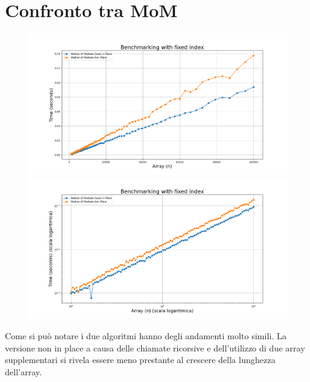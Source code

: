 \documentclass[a4paper]{article}
\begin{document}
\section{Confronto tra MoM}
\label{sec:confronto-mom}
\begin{figure}[h]
    \centering
    \includegraphics[width=.83\textwidth]{graphs/MoMs_n.png}
    \includegraphics[width=.83\textwidth]{graphs/MoMs_2xlog.png}
\end{figure}
Come si può notare i due algoritmi hanno degli andamenti molto simili. La versione non in place a causa delle chiamate ricorsive e dell'utilizzo di due array supplementari si rivela essere meno prestante al crescere della lunghezza dell'array.
\end{document}
